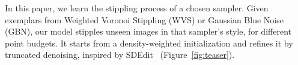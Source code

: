 \documentclass{egpubl}
\begin{document}




In this paper, we learn the stippling process of a chosen sampler. Given exemplars from Weighted Voronoi Stippling (WVS) or Gaussian Blue Noise (GBN), our model stipples unseen images in that sampler's style, for different point budgets. It starts from a density-weighted initialization and refines it by truncated denoising, inspired by SDEdit~\cite{meng2022sdeditguidedimagesynthesis} (Figure~\ref{fig:teaser}).
\end{document}
